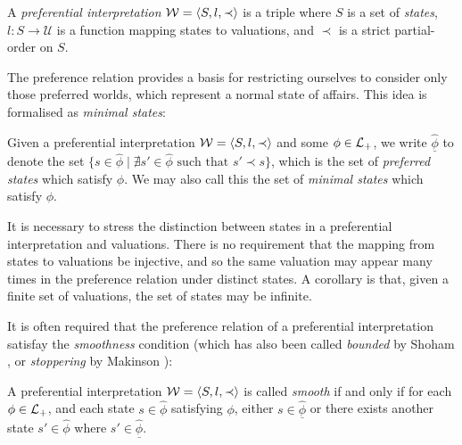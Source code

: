 \begin{definition}
	\label{definition:preferential-interpretation} 

	A \emph{preferential interpretation} $\mathcal{W} = \langle S,l,\prec \rangle$ is a triple where $S$ is a set of \emph{states}, $l: S \to \mathcal{U}$ is
	a function mapping states to valuations, and $\prec$ is a strict partial-order on $S$.
\end{definition}

The preference relation provides a basis for restricting ourselves to consider only those preferred worlds, which
represent a normal state of affairs. This idea is formalised as \textit{minimal states}:

\begin{definition}
	\label{definition:state-minimal}

	Given a preferential interpretation $\mathcal{W} = \langle S,l,\prec \rangle$ and some $\phi \in \mathcal{L}_+$, we write $\underline{\hat{\phi}}$ to denote the set
	$\{s \in \hat{\phi}\mid \nexists s' \in \hat{\phi}\text{ such that }s' \prec s \}$, which is the set of \textit{preferred
	states} which satisfy $\phi$. We may also call this the set of \textit{minimal states} which satisfy $\phi$.
\end{definition}

It is necessary to stress the distinction between states in a preferential interpretation and valuations. There is no
requirement that the mapping from states to valuations be injective, and so the same valuation may appear many times in the
preference relation under distinct states. A corollary is that, given a finite set of valuations, the set of states may
be infinite.

It is often required that the preference relation of a preferential interpretation satisfay the \textit{smoothness} condition
(which has also been called \textit{bounded} by Shoham \cite{shohamSemanticApproach}, or \textit{stoppering} by Makinson
\cite{makinson2003bridges}):

\begin{definition}
	\label{definition:smoothness} 

	A preferential interpretation $\mathcal{W} = \langle S,l,\prec \rangle$ is called \textit{smooth} if and only if for each $\phi \in \mathcal{L}_+$, and each
	state $s \in \hat{\phi}$ satisfying $\phi$, either $s \in \underline{\hat{\phi}}$ or there exists another state $s' \in
	\hat{\phi}$ where $s' \in \underline{\hat{\phi}}$.
\end{definition}

